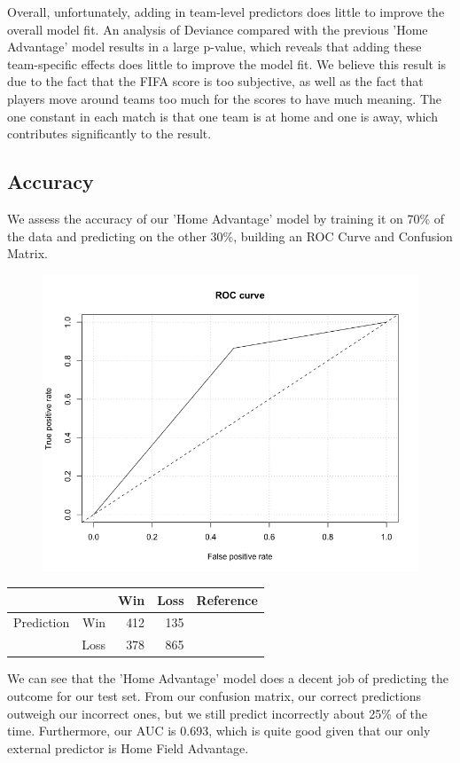 \documentclass{article}
\begin{document}
Overall, unfortunately, adding in team-level predictors does little to improve the overall model fit. An analysis of Deviance compared with the previous 'Home Advantage' model results in a large p-value, which reveals that adding these team-specific effects does little to improve the model fit. We believe this result is due to the fact that the FIFA score is too subjective, as well as the fact that players move around teams too much for the scores to have much meaning. The one constant in each match is that one team is at home and one is away, which contributes significantly to the result.

\subsection{Accuracy}

We assess the accuracy of our 'Home Advantage' model by training it on 70\% of the data and predicting on the other 30\%, building an ROC Curve and Confusion Matrix.

\begin{figure}[H]
\centering
\includegraphics[width=.5\linewidth]{roccurve.png}
\label{fig:sub1}
\end{figure}

\begin{table}[H]
\centering
\begin{tabular}{rrrrr}
  \hline
 & & Win &  Loss & Reference\\ 
  \hline
Prediction & Win  & 412 & 135 & \\
& Loss & 378 & 865 & \\
   \hline
\end{tabular}
\end{table}

We can see that the 'Home Advantage' model does a decent job of predicting the outcome for our test set. From our confusion matrix, our correct predictions outweigh our incorrect ones, but we still predict incorrectly about 25\% of the time. Furthermore, our AUC is 0.693, which is quite good given that our only external predictor is Home Field Advantage. 
\end{document}

